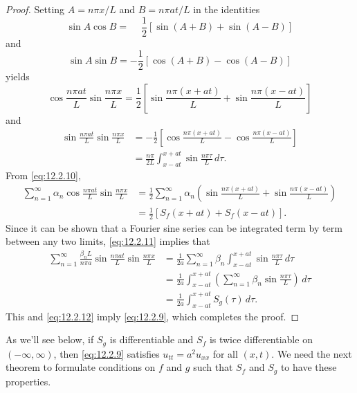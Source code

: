 \begin{proof}
Setting $A=n\pi x/L$ and $B=n\pi at/L$ in the  identities
\[
\sin A\cos B=\phantom{-}\frac{1}{2}[\sin(A+B)+\sin(A-B)]
\]
and
\[
\sin A\sin B=-\frac{1}{2}[\cos(A+B)-\cos(A-B)]
\]
yields
\begin{equation} \label{eq:12.2.10}
\cos\frac{n\pi at}{L}\sin\frac{n\pi x}{L}
=\frac{1}{2}\left[\sin\frac{n\pi(x+at)}{L}+\sin\frac{n\pi(x-at)}{L}\right]
\end{equation}
and
\begin{equation} \label{eq:12.2.11}
\begin{aligned}
\sin\frac{n\pi at}{L}\sin\frac{n\pi x}{L}
&=-\frac{1}{2}\left[\cos\frac{n\pi(x+at)}{L}-\cos\frac{n\pi(x-at)}{L}\right]\\
&=\frac{n\pi}{2L}\int_{x-at}^{x+at}\sin\frac{n\pi\tau}{L}\,d\tau.
\end{aligned}
\end{equation}
From  \eqref{eq:12.2.10},
\begin{equation} \label{eq:12.2.12}
\begin{aligned}
\sum_{n=1}^\infty\alpha_n \cos\frac{n\pi at}{L}\sin\frac{n\pi x}{L}
&=\frac{1}{2}\sum_{n=1}^\infty\alpha_n\left(\sin\frac{n\pi(x+at)}{L}
+\sin\frac{n\pi(x-at)}{L}\right)\\
&=\frac{1}{2}[S_f(x+at)+S_f(x-at)].
\end{aligned}
\end{equation}
Since it can be shown that a Fourier sine series can be integrated
term by term between any two limits,
\eqref{eq:12.2.11} implies that
\begin{align*}
\sum_{n=1}^\infty\frac{\beta_nL}{n\pi a}
\sin\frac{n\pi at}{L}\sin\frac{n\pi x}{L}
&=\frac{1}{2a}\sum_{n=1}^\infty \beta_n\int_{x-at}^{x+at}
\sin\frac{n\pi\tau}{L}\,d\tau\\
&=\frac{1}{2a}\int_{x-at}^{x+at}\left(\sum_{n=1}^\infty \beta_n
\sin\frac{n\pi\tau}{L}\right)\,d\tau\\
&=\frac{1}{2a}\int_{x-at}^{x+at}S_g(\tau)\,d\tau.
\end{align*}
This and  \eqref{eq:12.2.12} imply \eqref{eq:12.2.9},
which completes the proof.
\end{proof}

As we'll see below, if $S_g$ is differentiable and $S_f$
is twice differentiable on $(-\infty,\infty)$, then
\eqref{eq:12.2.9} satisfies $u_{tt}=a^2u_{xx}$ for all $(x,t)$. We need the
next theorem to formulate conditions on $f$ and $g$ such that
$S_f$ and $S_g$ to have these properties.


